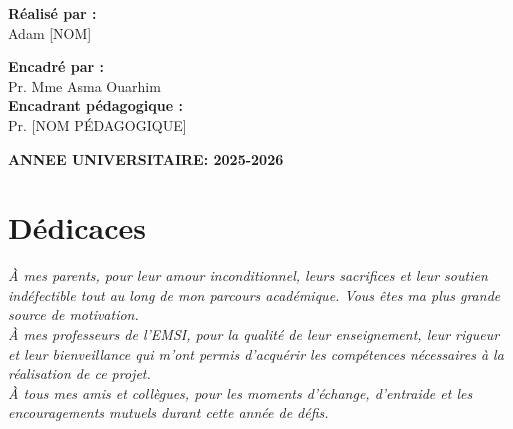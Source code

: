 \documentclass[12pt,a4paper]{report}
\begin{document}
\begin{titlepage}
    \begin{minipage}{0.45\textwidth}
        \begin{flushleft} \large
            \textbf{Réalisé par :}\\
            \vspace{0.2cm}
            Adam [NOM]
        \end{flushleft}
    \end{minipage}
    \hfill
    \begin{minipage}{0.45\textwidth}
        \begin{flushright} \large
            \textbf{Encadré par :} \\
            \vspace{0.2cm}
            Pr. Mme Asma Ouarhim \\
            \vspace{0.1cm}
            \textbf{Encadrant pédagogique :} \\
            Pr. [NOM PÉDAGOGIQUE]
        \end{flushright}
    \end{minipage}
    
    \vfill
    
    {\large \textbf{ANNEE UNIVERSITAIRE: 2025-2026}}
    \vspace{1cm}
\end{titlepage}


\chapter*{Dédicaces}
\begin{center}
    \emph{À mes parents, pour leur amour inconditionnel, leurs sacrifices et leur soutien indéfectible tout au long de mon parcours académique. Vous êtes ma plus grande source de motivation.} \\
    \vspace{1cm}
    \emph{À mes professeurs de l'EMSI, pour la qualité de leur enseignement, leur rigueur et leur bienveillance qui m'ont permis d'acquérir les compétences nécessaires à la réalisation de ce projet.} \\
    \vspace{1cm}
    \emph{À tous mes amis et collègues, pour les moments d'échange, d'entraide et les encouragements mutuels durant cette année de défis.}
\end{center}
\end{document}
